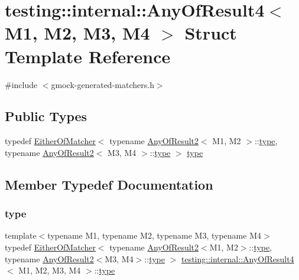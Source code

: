\hypertarget{structtesting_1_1internal_1_1_any_of_result4}{}\section{testing\+:\+:internal\+:\+:Any\+Of\+Result4$<$ M1, M2, M3, M4 $>$ Struct Template Reference}
\label{structtesting_1_1internal_1_1_any_of_result4}


{\ttfamily \#include $<$gmock-\/generated-\/matchers.\+h$>$}

\subsection*{Public Types}
\begin{DoxyCompactItemize}
\item 
typedef \hyperlink{classtesting_1_1internal_1_1_either_of_matcher}{Either\+Of\+Matcher}$<$ typename \hyperlink{structtesting_1_1internal_1_1_any_of_result2}{Any\+Of\+Result2}$<$ M1, M2 $>$\+::\hyperlink{structtesting_1_1internal_1_1_any_of_result4_a4f3c9aebb4f7fc24287b59a0bdf1a4a6}{type}, typename \hyperlink{structtesting_1_1internal_1_1_any_of_result2}{Any\+Of\+Result2}$<$ M3, M4 $>$\+::\hyperlink{structtesting_1_1internal_1_1_any_of_result4_a4f3c9aebb4f7fc24287b59a0bdf1a4a6}{type} $>$ \hyperlink{structtesting_1_1internal_1_1_any_of_result4_a4f3c9aebb4f7fc24287b59a0bdf1a4a6}{type}
\end{DoxyCompactItemize}


\subsection{Member Typedef Documentation}
\mbox{\label{structtesting_1_1internal_1_1_any_of_result4_a4f3c9aebb4f7fc24287b59a0bdf1a4a6}} 
\subsubsection{\texorpdfstring{type}{type}}
{\footnotesize\ttfamily template$<$typename M1, typename M2, typename M3, typename M4$>$ \\
typedef \hyperlink{classtesting_1_1internal_1_1_either_of_matcher}{Either\+Of\+Matcher}$<$ typename \hyperlink{structtesting_1_1internal_1_1_any_of_result2}{Any\+Of\+Result2}$<$M1, M2$>$\+::\hyperlink{structtesting_1_1internal_1_1_any_of_result4_a4f3c9aebb4f7fc24287b59a0bdf1a4a6}{type}, typename \hyperlink{structtesting_1_1internal_1_1_any_of_result2}{Any\+Of\+Result2}$<$M3, M4$>$\+::\hyperlink{structtesting_1_1internal_1_1_any_of_result4_a4f3c9aebb4f7fc24287b59a0bdf1a4a6}{type} $>$ \hyperlink{structtesting_1_1internal_1_1_any_of_result4}{testing\+::internal\+::\+Any\+Of\+Result4}$<$ M1, M2, M3, M4 $>$\+::\hyperlink{structtesting_1_1internal_1_1_any_of_result4_a4f3c9aebb4f7fc24287b59a0bdf1a4a6}{type}}



